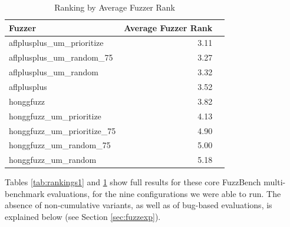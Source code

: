     \begin{table}
      \begin{tabular}{l|r|r}
        Fuzzer & Average Fuzzer Rank \\
        \hline
        \hline
aflplusplus\_um\_prioritize & 3.11 \\
aflplusplus\_um\_random\_75 & 3.27 \\
aflplusplus\_um\_random & 3.32 \\
aflplusplus & 3.52 \\
honggfuzz & 3.82 \\
honggfuzz\_um\_prioritize & 4.13 \\
honggfuzz\_um\_prioritize\_75 & 4.90 \\
honggfuzz\_um\_random\_75 & 5.00 \\
honggfuzz\_um\_random & 5.18 \\
      \end{tabular}
      \caption{Ranking by Average Fuzzer Rank}
      \label{tab:rankings2}
    \end{table}
    
Tables \ref{tab:rankings1} and \ref{tab:rankings2} show full results for these core FuzzBench multi-benchmark evaluations, for the nine configurations we were able to run.  The absence of non-cumulative variants, as well as of bug-based evaluations, is explained below (see Section \ref{sec:fuzzexp}).


